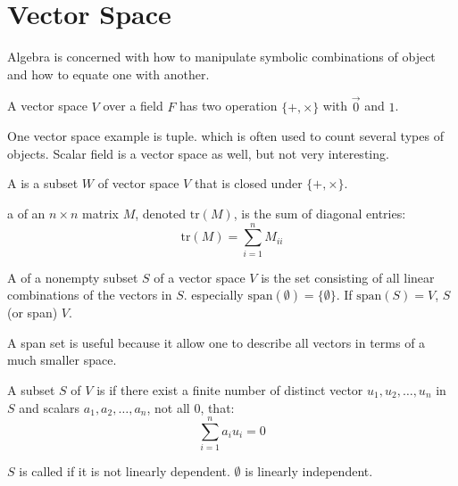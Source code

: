 \section{Vector Space}

Algebra is concerned with how to manipulate symbolic combinations of object and how to equate one with another.

\begin{definition}
A  vector space $V$ over a  field $F$ has two operation $\{+,\times\}$ with $\vec{0}$ and $1$.
\end{definition}

One vector space example is tuple. which is often used to count several types of objects. Scalar field is a vector space as well, but not very interesting.


\begin{definition}
	A  is a subset $W$ of vector space $V$ that is closed under $\{+,\times\}$.
\end{definition}

\begin{definition}
	a  of an $n \times n$ matrix $M$, denoted $\text{tr}(M)$, is the sum of diagonal entries:
	\begin{equation}
		\text{tr}(M) = \sum_{i=1}^n M_{ii}
	\end{equation}
\end{definition}

\begin{definition}
	A  of a nonempty subset $S$ of a vector space $V$ is the set consisting of all linear combinations of the vectors in $S$. especially $\text{span}(\emptyset) = \{ \emptyset \}$. If $\text{span}(S) =V$, $S$  (or span) $V$.
\end{definition}

A span set is useful because it allow one to describe all vectors in terms of a much smaller space.

\begin{definition}
	A subset $S$ of $V$ is  if there exist a finite number of distinct vector $u_1, u_2, \dots, u_n$ in $S$ and scalars $a_1, a_2, \dots, a_n$, not all $0$, that:
	\begin{equation}
		\sum_{i=1}^n a_i u_i = 0
	\end{equation}
	
	$S$ is called  if it is not linearly dependent. $\emptyset$ is linearly independent.
\end{definition}

